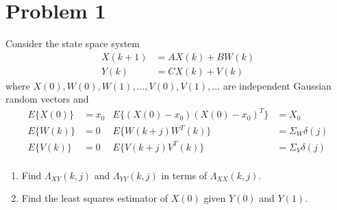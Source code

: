 \section*{Problem 1}

Consider the state space system
\begin{align*}
    X(k+1) & = AX(k) + BW(k) \\
    Y(k) & = CX(k) + V(k)
\end{align*}
where $X(0), W(0), W(1), \ldots, V(0), V(1), \ldots$ are independent Gaussian random vectors and
\begin{align*}
    E\{X(0)\} & = x_0 
        & E\{ (X(0) - x_0) (X(0) - x_0)^T \} & = X_0 \\
    E\{W(k)\} & = 0
        & E\{ W(k+j) W^T(k) \} & = \Sigma_W \delta(j) \\
    E\{V(k)\} & = 0
        & E\{ V(k+j) V^T(k) \} & = \Sigma_V \delta(j) \\
\end{align*}

\begin{enumerate}
    \item
    Find $\Lambda_{XY}(k,j)$ and $\Lambda_{YY}(k,j)$ in terms of $\Lambda_{XX}(k,j)$.
    
    \item
    Find the least squares estimator of $X(0)$ given $Y(0)$ and $Y(1)$.
    
\end{enumerate}